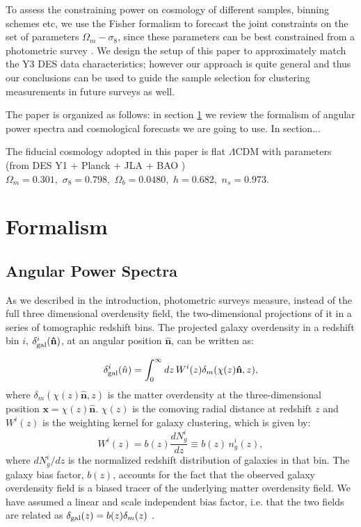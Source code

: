 \documentclass[a4paper,fleqn,usenatbib]{mnras}
\begin{document}
To assess the constraining power on cosmology of different samples, binning schemes etc, we use the Fisher formalism to forecast the joint constraints on the set of parameters $\Omega_m - \sigma_8$,  since these parameters can be best constrained from a photometric survey \citep{DES1}. We design the setup of this paper to approximately match the Y3 DES data characteristics; however our approach is quite general and thus our conclusions can be used to guide the sample selection for clustering measurements in future surveys as well. 

The paper is organized as follows:  in section \ref{sec: formalism} we review the formalism of  angular power spectra and cosmological forecasts we are going to use. In section...

The fiducial cosmology adopted in this paper is flat $\Lambda$CDM with parameters (from DES Y1 + Planck + JLA + BAO \citep[TABLE II]{DES1}) $\Omega_m = 0.301, \,\,\sigma_8 = 0.798, \,\, \Omega_b = 0.0480, \,\, h = 0.682, \,\, n_s = 0.973$. 



\section{Formalism}
\label{sec: formalism} %


\subsection{Angular Power Spectra}
\label{subsec: APS}

As we described in the introduction, photometric surveys measure, instead of the full three dimensional overdensity  field, the  two-dimensional projections of it in a series of tomographic redshift bins. The projected galaxy overdensity in a redshift bin $i$, $\delta^i_{\mbox{\scriptsize{gal}}}(\mathbf{\hat{n}})$, at an angular position $\mathbf{\hat{n}}$, can be written as:

\begin{equation}
\delta^i_{\mbox{\scriptsize{gal}}}(\hat{n})  = \int_0^\infty  dz\, W^i(z) \delta_m(\chi(z)\mathbf{\hat{n}},z),
\end{equation}
where  $\delta_m(\chi(z)\mathbf{\hat{n}},z)$  is the matter overdensity at the three-dimensional position $\mathbf{x} = \chi (z)\mathbf{\hat{n}}$.  $\chi(z)$ is the comoving radial distance at redshift $z$ and $W^{i}(z)$ is the weighting kernel for galaxy clustering, which is given by:
\begin{equation}
W^{i}(z) = b(z)\frac{dN_g^i}{dz} \equiv b(z)\,n^i_g(z),
\end{equation}
where $dN_g^i/dz$ is the normalized redshift distribution of galaxies in that bin. The galaxy bias factor, $b(z)$, accounts for the fact that the observed galaxy overdensity field is a biased tracer of the underlying matter overdensity field.  We have assumed a linear and scale independent bias factor, i.e. that the two fields are related as $\delta_{\mbox{\scriptsize{gal}}} (z) = b(z) \delta_m(z)$ \citep{Fry1993}.
\end{document}
